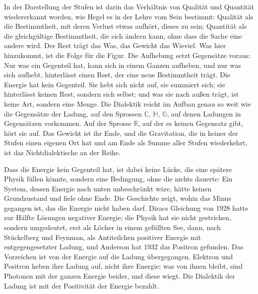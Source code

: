 \documentclass[11pt,a4paper]{article}
\newcommand{\Randlesart}{\marginpar{\raggedright\footnotesize\textcolor{lesart}{$\bigcirc$\,Lesart}}}
\newcommand{\R}{\mathbb R}
\newcommand{\C}{\mathbb C}
\newcommand{\HH}{\mathbb H}
\newcommand{\Oc}{\mathbb O}
\begin{document}
\Randlesart In der Darstellung der Stufen ist darin das Verhältnis von Qualität und Quantität wiedererkannt worden, wie Hegel es in der Lehre vom Sein bestimmt: Qualität als die Bestimmtheit, mit deren Verlust etwas aufhört, dieses zu sein; Quantität als die gleichgültige Bestimmtheit, die sich ändern kann, ohne dass die Sache eine andere wird. Der Rest trägt das Was, das Gewicht das Wieviel. Was hier hinzukommt, ist die Folge für die Figur. Die Aufhebung setzt Gegensätze voraus: Nur was ein Gegenteil hat, kann sich in einem Ganzen aufheben, und nur was sich aufhebt, hinterlässt einen Rest, der eine neue Bestimmtheit trägt. Die Energie hat kein Gegenteil. Sie hebt sich nicht auf, sie summiert sich; sie hinterlässt keinen Rest, sondern sich selbst; und was sie nach außen trägt, ist keine Art, sondern eine Menge. Die Dialektik reicht im Aufbau genau so weit wie die Gegensätze der Ladung, auf den Sprossen $\C$, $\HH$, $\Oc$, auf denen Ladungen in Gegensätzen vorkommen. Auf der Sprosse $\R$, auf der es keinen Gegensatz gibt, hört sie auf. Das Gewicht ist ihr Ende, und die Gravitation, die in keiner der Stufen einen eigenen Ort hat und am Ende als Summe aller Stufen wiederkehrt, ist das Nichtdialektische an der Reihe.

Dass die Energie kein Gegenteil hat, ist dabei keine Lücke, die eine spätere Physik füllen könnte, sondern eine Bedingung, ohne die nichts dauerte: Ein System, dessen Energie nach unten unbeschränkt wäre, hätte keinen Grundzustand und fiele ohne Ende. Die Geschichte zeigt, wohin das Minus gegangen ist, das die Energie nicht haben darf. Diracs Gleichung von 1928 hatte zur Hälfte Lösungen negativer Energie; die Physik hat sie nicht gestrichen, sondern umgedeutet, erst als Löcher in einem gefüllten See, dann, nach Stückelberg und Feynman, als Antiteilchen positiver Energie mit entgegengesetzter Ladung, und Anderson hat 1932 das Positron gefunden. Das Vorzeichen ist von der Energie auf die Ladung übergegangen. Elektron und Positron heben ihre Ladung auf, nicht ihre Energie; was von ihnen bleibt, sind Photonen mit der ganzen Energie beider, und diese wiegt. Die Dialektik der Ladung ist mit der Positivität der Energie bezahlt.
\end{document}
